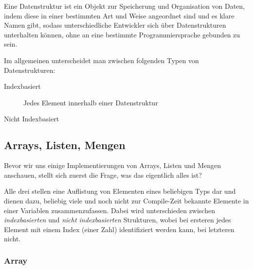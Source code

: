 
Eine Datenstruktur ist ein Objekt zur Speicherung und Organisation von Daten, indem diese in einer bestimmten Art und Weise angeordnet sind und es klare Namen gibt, sodass unterschiedliche Entwickler sich über  Datenstrukturen unterhalten können, ohne an eine bestimmte Programmiersprache gebunden zu sein.


Im allgemeinen unterscheidet man zwischen folgenden Typen von Datenstrukturen:
\begin{description}
	\item[Indexbasiert] Jedes Element innerhalb einer Datenstruktur 
	\item[Nicht Indexbasiert]
\end{description}

\subsection{Arrays, Listen, Mengen} \functionalMark \imperativeMark \oopMark
	Bevor wir uns einige Implementierungen von Arrays, Listen und Mengen anschauen, stellt sich zuerst die Frage, was das eigentlich alles ist?
	
	Alle drei stellen eine Auflistung von Elementen eines beliebigen Typs dar und dienen dazu, beliebig viele und noch nicht zur Compile-Zeit bekannte Elemente in einer Variablen zusammenzufassen. Dabei wird unterschieden zwischen \textit{indexbasierten} und \textit{nicht indexbasierten} Strukturen, wobei bei ersteren jedes Element mit einem Index (einer Zahl) identifiziert werden kann, bei letzteren nicht.
	
	\subsubsection{Array}
	
